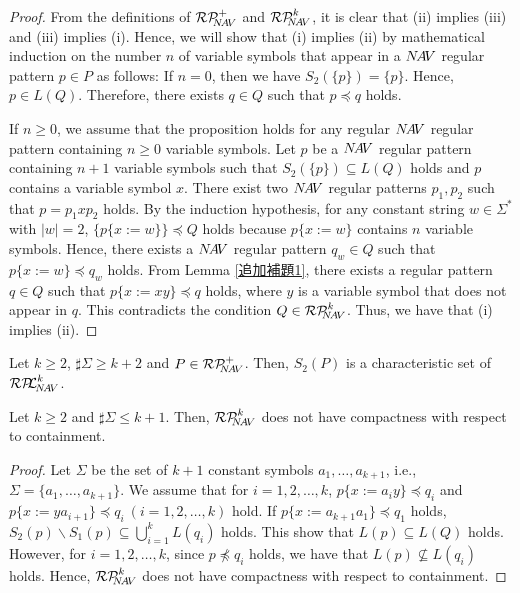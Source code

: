 \begin{proof}
From the definitions of $\mathcal{RP}^{+}_{\!\!\!N\!A\!V}$ and $\mathcal{RP}^{k}_{\!\!\!N\!A\!V}$, it is clear that (ii) implies (iii)  and  (iii) implies (i).
Hence, we will show that (i) implies (ii) 
by mathematical induction on the number $n$ of variable symbols that appear in a $N\!A\!V$ regular pattern $p\in P$ as follows:
If $n=0$, then we have $S_{2}(\{p\})= \{ p \}$.
Hence, $p \in L(Q)$.
Therefore, there exists $q \in Q$ such that $p \preceq q$ holds.

If $n \ge 0$, we assume that the proposition holds for any regular $N\!A\!V$ regular pattern containing $n \ge 0$ variable symbols.
Let $p$ be a $N\!A\!V$ regular pattern containing $n+1$ variable symbols such that $S_{2}(\{p\}) \subseteq L(Q)$ holds and $p$ contains a variable symbol $x$.
There exist two $N\!A\!V$ regular patterns $p_{1},p_{2}$ such that $p=p_{1}xp_{2}$ holds.
By the induction hypothesis, for any constant string $w\in \Sigma^{\ast}$ with $|w|=2$, $\{p\{x:=w\}\}\preceq Q$ holds because $p\{x:=w\}$ contains $n$ variable symbols.
Hence, there exists a $N\!A\!V$ regular pattern $q_{w} \in Q$ such that $p \{ x:=w \} \preceq q_{w}$ holds.
From Lemma \ref{追加補題1}, there exists a regular pattern $q \in Q$ such that $p \{ x:=xy \} \preceq q$ holds, where $y$ is a variable symbol that does not appear in $q$.
This contradicts the condition $Q \in \mathcal{RP}^{k}_{\!\!\!N\!A\!V}$.
Thus, we have that (i) implies (ii).
\end{proof}

\begin{col}
Let $k\ge 2$, $\sharp\Sigma \ge k+2$ and $P \in \mathcal{RP}^{+}_{\!\!\!N\!A\!V}$.
Then, $S_{2}(P)$ is a characteristic set of $\mathcal{RP\!\!L}^{k}_{\!N\!A\!V}$.%
\end{col}

\begin{lem}\label{Case_k+2}\label{k+2のとき}
Let $k\ge 2$ and $\sharp\Sigma \le k+1$.
Then, $\mathcal{RP}^{k}_{\!\!\!N\!A\!V}$ does not have compactness with respect to containment.
\end{lem}
\begin{proof}
Let $\Sigma$ be the set of $k+1$ constant symbols $a_{1}, \ldots , a_{k+1}$, i.e., $\Sigma = \{ a_{1}, \ldots , a_{k+1} \}$.
We assume that for $i=1,2,\ldots,k$, $p \{ x := a_{i}y \} \preceq q_{i}$ and $p \{ x := ya_{i+1} \} \preceq q_{i}~(i=1,2, \ldots ,k)$ hold.
If $p \{ x:= a_{k+1}a_{1} \} \preceq q_{1}$ holds, $S_{2}(p) \backslash S_{1}(p) \subseteq \bigcup^{k}_{i=1} L(q_{i})$ holds.
This show that $L(p) \subseteq L(Q)$ holds.
However, for $i=1,2,\ldots,k$, since $p \not \preceq q_{i}$ holds, we have that $L(p) \not \subseteq L(q_{i})$ holds.
Hence, $\mathcal{RP}^{k}_{\!\!\!N\!A\!V}$ does not have compactness with respect to containment.
\end{proof}

